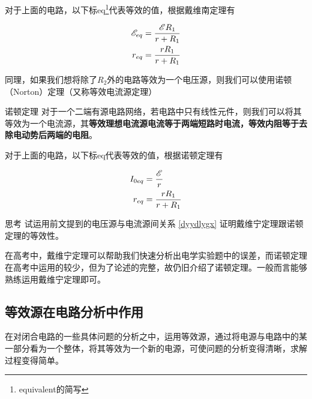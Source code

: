 对于上面的电路，以下标eq\footnote{equivalent的简写}代表等效的值，根据戴维南定理有



\begin{subequations}
\begin{align*}
\mathscr{E}_{eq} &= \frac{\mathscr{E} R_1}{r + R_1} \\
r_{eq} &= \frac{r R_1}{r + R_1}
\end{align*}
\end{subequations}

同理，如果我们想将除了$R_2$外的电路等效为一个电压源，则我们可以使用诺顿（Norton）定理（又称等效电流源定理）

\begin{theo}{诺顿定理}{}
对于一个二端有源电路网络，若电路中只有线性元件，则我们可以将其等效为一个电流源，其\textbf{等效理想电流源电流等于两端短路时电流，等效内阻等于去除电动势后两端的电阻}。
\end{theo}

对于上面的电路，以下标eq代表等效的值，根据诺顿定理有



\begin{subequations}
\begin{align*}
I_{0 eq} &= \frac{\mathscr{E}}{r} \\
r_{eq} &= \frac{r R_1}{r + R_1}
\end{align*}
\end{subequations}

\begin{mk}{思考}{}
试运用前文提到的电压源与电流源间关系 \eqref{dyydlygx} 证明戴维宁定理跟诺顿定理的等效性。
\end{mk}

在高考中，戴维宁定理可以帮助我们快速分析出电学实验题中的误差，而诺顿定理在高考中运用的较少，但为了论述的完整，故仍旧介绍了诺顿定理。一般而言能够熟练运用戴维宁定理即可。

\subsection{等效源在电路分析中作用}

在对闭合电路的一些具体问题的分析之中，运用等效源，通过将电源与电路中的某一部分看为一个整体，将其等效为一个新的电源，可使问题的分析变得清晰，求解过程变得简单。

